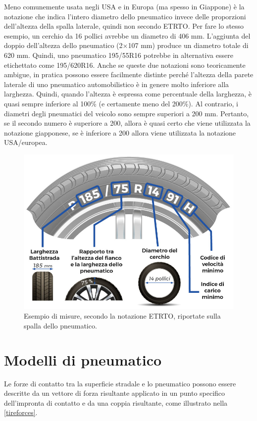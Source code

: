 Meno comunemente usata negli USA e in Europa (ma spesso in Giappone) è la notazione che indica l'intero diametro dello pneumatico invece delle proporzioni dell'altezza della spalla laterale, quindi non secondo \ac{ETRTO}. Per fare lo stesso esempio, un cerchio da 16 pollici avrebbe un diametro di 406 mm. L'aggiunta del doppio dell'altezza dello pneumatico (2$\times$107 mm) produce un diametro totale di 620 mm. Quindi, uno pneumatico 195/55R16 potrebbe in alternativa essere etichettato come 195/620R16. Anche se queste due notazioni sono teoricamente ambigue, in pratica possono essere facilmente distinte perché l'altezza della parete laterale di uno pneumatico automobilistico è in genere molto inferiore alla larghezza. Quindi, quando l'altezza è espressa come percentuale della larghezza, è quasi sempre inferiore al 100\% (e certamente meno del 200\%). Al contrario, i diametri degli pneumatici del veicolo sono sempre superiori a 200 mm. Pertanto, se il secondo numero è superiore a 200, allora è quasi certo che viene utilizzata la notazione giapponese, se è inferiore a 200 allora viene utilizzata la notazione USA/europea.

\begin{figure}[h]
	\centering
	\includegraphics[width=0.7\linewidth]{Figures/tire_measures}
	\caption{Esempio di misure, secondo la notazione ETRTO, riportate sulla spalla dello pneumatico.}
	\label{tiremeasures}
\end{figure}
%
\section{Modelli di pneumatico}
Le forze di contatto tra la superficie stradale e lo pneumatico possono essere descritte da un vettore di forza risultante applicato in un punto specifico dell'impronta di contatto e da una coppia risultante, come illustrato nella \figurename{  \ref{tireforces}}.

